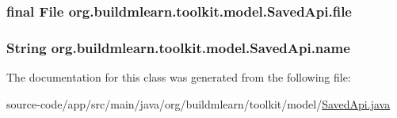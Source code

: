 \subsubsection[{\texorpdfstring{file}{file}}]{\setlength{\rightskip}{0pt plus 5cm}final File org.\+buildmlearn.\+toolkit.\+model.\+Saved\+Api.\+file\hspace{0.3cm}{\ttfamily [private]}}\hypertarget{classorg_1_1buildmlearn_1_1toolkit_1_1model_1_1SavedApi_a4d6618eb1dbe1911ae4cfd5f29809f51}{}\label{classorg_1_1buildmlearn_1_1toolkit_1_1model_1_1SavedApi_a4d6618eb1dbe1911ae4cfd5f29809f51}
\subsubsection[{\texorpdfstring{name}{name}}]{\setlength{\rightskip}{0pt plus 5cm}String org.\+buildmlearn.\+toolkit.\+model.\+Saved\+Api.\+name\hspace{0.3cm}{\ttfamily [private]}}\hypertarget{classorg_1_1buildmlearn_1_1toolkit_1_1model_1_1SavedApi_aae17c0552791a74ddc24301d675d4f75}{}\label{classorg_1_1buildmlearn_1_1toolkit_1_1model_1_1SavedApi_aae17c0552791a74ddc24301d675d4f75}


The documentation for this class was generated from the following file\+:\begin{DoxyCompactItemize}
\item 
source-\/code/app/src/main/java/org/buildmlearn/toolkit/model/\hyperlink{SavedApi_8java}{Saved\+Api.\+java}\end{DoxyCompactItemize}
